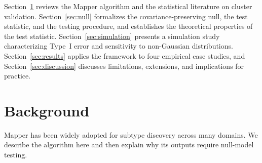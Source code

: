 \documentclass[hidelinks]{siamart251216}
\begin{document}
Section~\ref{sec:background} reviews the Mapper algorithm and the
statistical literature on cluster validation.
Section~\ref{sec:null} formalizes the covariance-preserving null, the
test statistic, and the testing procedure, and establishes the
theoretical properties of the test statistic.
Section~\ref{sec:simulation} presents a simulation study characterizing
Type~I error and sensitivity to non-Gaussian distributions.
Section~\ref{sec:results} applies the framework to four empirical case
studies, and Section~\ref{sec:discussion} discusses limitations,
extensions, and implications for practice.


\section{Background}\label{sec:background}

Mapper has been widely adopted for
subtype discovery across many domains.  We describe the algorithm here
and then explain why its outputs require null-model testing.
\end{document}
